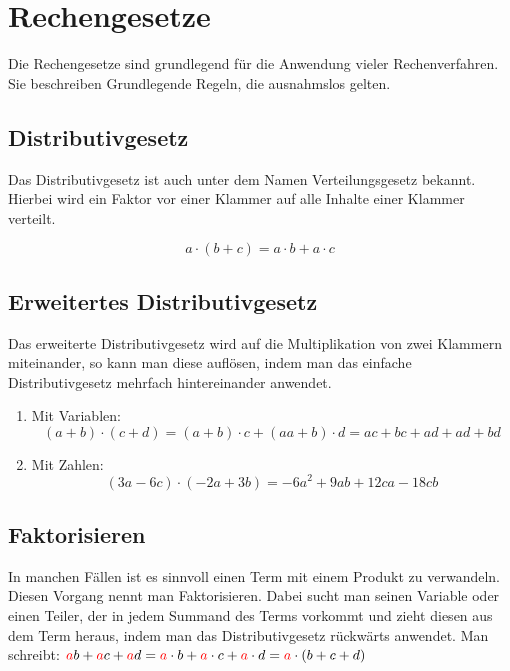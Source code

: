 
\section{Rechengesetze}
Die Rechengesetze sind grundlegend für die Anwendung vieler Rechenverfahren. Sie beschreiben Grundlegende Regeln, die ausnahmslos gelten.

\subsection{Distributivgesetz}
Das Distributivgesetz ist auch unter dem Namen Verteilungsgesetz bekannt. Hierbei wird ein Faktor vor einer Klammer auf alle Inhalte einer Klammer verteilt. 

\begin{beispiel}
	\[a\cdot(b+c)=a\cdot b+a\cdot c\]
\end{beispiel}
\subsection{Erweitertes Distributivgesetz}
Das erweiterte Distributivgesetz wird auf die Multiplikation von zwei Klammern miteinander, so kann man diese auflösen, indem man das einfache Distributivgesetz mehrfach hintereinander anwendet. 

\begin{beispiel}
	\begin{enumerate}
		\item Mit Variablen: \[(a+b)\cdot(c+d)=(a+b)\cdot c+(aa+b)\cdot d=ac+bc+ad+ad+bd\]
		\item Mit Zahlen: \[(3a-6c)\cdot (-2a+3b)=-6a^2+9ab+12ca-18cb\]
	\end{enumerate}
\end{beispiel}
\pagebreak
\subsection{Faktorisieren}
In manchen Fällen ist es sinnvoll einen Term mit einem Produkt zu verwandeln. Diesen Vorgang nennt man Faktorisieren. Dabei sucht man seinen Variable oder einen Teiler, der in jedem Summand des Terms vorkommt und zieht diesen aus dem Term heraus, indem man das Distributivgesetz rückwärts anwendet.
Man schreibt: $\color {red}a\color {black}b+\color {red}a\color {black}c+\color {red}a\color {black}d=\color {red}a\color {black}\cdot b+\color {red}a\color {black}\cdot c+\color {red}a\color {black}\cdot d=\color {red}a\color {black}\cdot(b+c+d)$

